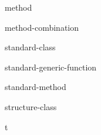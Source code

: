\begin{class}{method}{}{}{}
  
\end{class}

\begin{class}{method-combination}{}{}{}
  
\end{class}

\begin{class}{standard-class}{}{}{}
  
\end{class}

\begin{class}{standard-generic-function}{}{}{}
  
\end{class}

\begin{class}{standard-method}{}{}{}
  
\end{class}

\begin{class}{structure-class}{}{}{}
  
\end{class}

\begin{class}{t}{}{}{}
  
\end{class}
